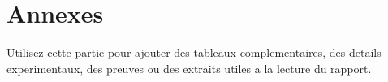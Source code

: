 \chapter{Annexes}

Utilisez cette partie pour ajouter des tableaux complementaires, des details
experimentaux, des preuves ou des extraits utiles a la lecture du rapport.
